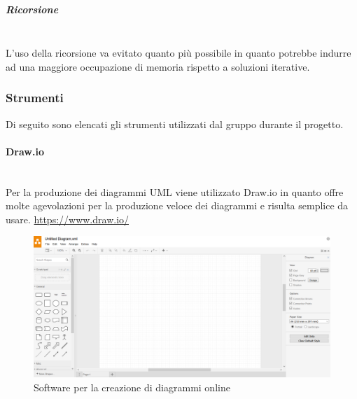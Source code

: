 \subparagraph{Ricorsione} \mbox{}\\
L'uso della ricorsione va evitato quanto più possibile in  quanto  potrebbe
indurre  ad  una  maggiore  occupazione  di  memoria  rispetto  a  soluzioni
iterative.
\subsubsection{Strumenti}
Di seguito sono elencati gli strumenti utilizzati dal gruppo durante il progetto.
\paragraph{Draw.io} \mbox{}\\
Per la produzione dei diagrammi UML viene utilizzato Draw.io in quanto offre molte agevolazioni per la produzione veloce dei diagrammi e risulta semplice da usare.
\url{https://www.draw.io/}
\begin{figure}[H]
	\includegraphics[width=0.99\linewidth]{res/images/drawio.png}
	\caption{Software per la creazione di diagrammi online}
\end{figure} 
